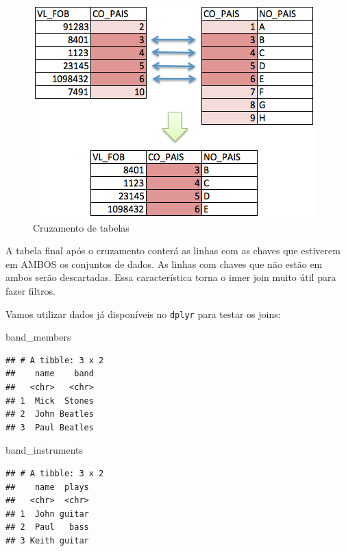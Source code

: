 \documentclass[]{book}
\newenvironment{Shaded}{\begin{snugshade}}{\end{snugshade}}
\newcommand{\NormalTok}[1]{#1}
\begin{document}
\begin{figure}

{\centering \includegraphics[width=1\linewidth]{imagens/inner_join} 

}

\caption{Cruzamento de tabelas}\label{fig:unnamed-chunk-99}
\end{figure}

A tabela final após o cruzamento conterá as linhas com as chaves que
estiverem em AMBOS os conjuntos de dados. As linhas com chaves que não
estão em ambos serão descartadas. Essa característica torna o inner join
muito útil para fazer filtros.

Vamos utilizar dados já disponíveis no \texttt{dplyr} para testar os
joins:

\begin{Shaded}
\begin{Highlighting}[]
\NormalTok{band_members}
\end{Highlighting}
\end{Shaded}

\begin{verbatim}
## # A tibble: 3 x 2
##    name    band
##   <chr>   <chr>
## 1  Mick  Stones
## 2  John Beatles
## 3  Paul Beatles
\end{verbatim}

\begin{Shaded}
\begin{Highlighting}[]
\NormalTok{band_instruments}
\end{Highlighting}
\end{Shaded}

\begin{verbatim}
## # A tibble: 3 x 2
##    name  plays
##   <chr>  <chr>
## 1  John guitar
## 2  Paul   bass
## 3 Keith guitar
\end{verbatim}
\end{document}

